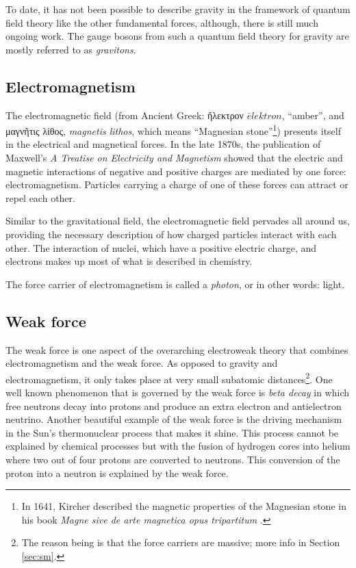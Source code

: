 To date, it has not been possible to describe gravity in the framework of quantum field theory like the other fundamental forces, although, there is still much ongoing work. The gauge bosons from such a quantum field theory for gravity are mostly referred to as \textit{gravitons}.

\subsection{Electromagnetism}
The electromagnetic field (from Ancient Greek: \gr ἤλεκτρον \en $\bar{e}lektron$, ``amber'', and \gr μαγνῆτις λίθος, \en \textit{magnetis lithos}, which means ``Magnesian stone''\footnote{In 1641, Kircher described the magnetic properties of the Magnesian stone in his book \textit{Magne sive de arte magnetica opus tripartitum} \cite{kircher1641athanasii}.}) presents itself in the electrical and magnetical forces. In the late 1870s, the publication of Maxwell's \textit{A Treatise on Electricity and Magnetism} showed that the electric and magnetic interactions of negative and positive charges are mediated by one force: electromagnetism. Particles carrying a charge of one of these forces can attract or repel each other.

Similar to the gravitational field, the electromagnetic field pervades all around us, providing the necessary description of how charged particles interact with each other. The interaction of nuclei, which have a positive electric charge, and electrons makes up most of what is described in chemistry. 

The force carrier of electromagnetism is called a \textit{photon}, or in other words: light.
\subsection{Weak force}
\label{subsec:weak}
The weak force is one aspect of the overarching electroweak theory that combines electromagnetism and the weak force. As opposed to gravity and electromagnetism, it only takes place at very small subatomic distances\footnote{The reason being is that the force carriers are massive; more info in Section \ref{sec:sm}.}. One well known phenomenon that is governed by the weak force is \textit{beta decay} in which free neutrons decay into protons and produce an extra electron and antielectron neutrino. Another beautiful example of the weak force is the driving mechanism in the Sun's thermonuclear process that makes it shine. This process cannot be explained by chemical processes but with the fusion of hydrogen cores into helium where two out of four protons are converted to neutrons. This conversion of the proton into a neutron is explained by the weak force.


